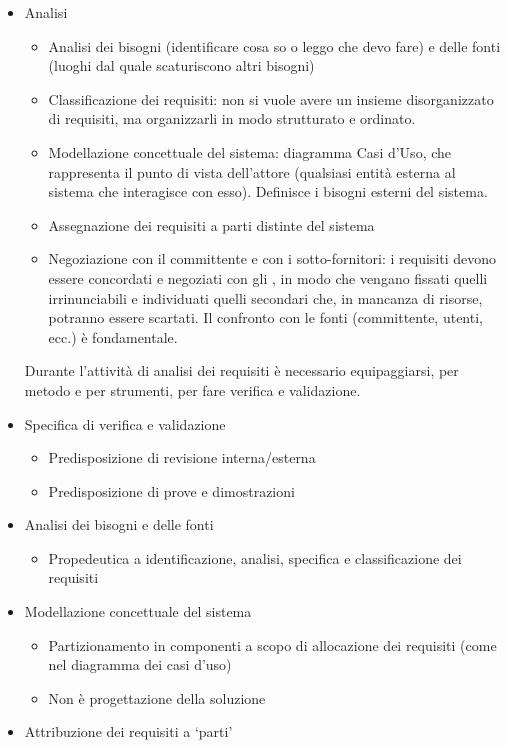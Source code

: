 \begin{itemize}
  \item Analisi
    \begin{itemize}
      \item Analisi dei bisogni (identificare cosa so o leggo che devo fare) e
            delle fonti (luoghi dal quale scaturiscono altri bisogni)
      \item Classificazione dei requisiti: non si vuole avere un insieme
            disorganizzato di requisiti, ma organizzarli in modo strutturato e
            ordinato.
      \item Modellazione concettuale del sistema: diagramma Casi d'Uso, che
            rappresenta il punto di vista dell'attore (qualsiasi entità esterna
            al sistema che interagisce con esso). Definisce i bisogni esterni
            del sistema.
      \item Assegnazione dei requisiti a parti distinte del sistema
      \item Negoziazione con il committente e con i sotto-fornitori: i requisiti
            devono essere concordati e negoziati con gli ,
            in modo che vengano fissati quelli irrinunciabili e individuati
            quelli secondari che, in mancanza di risorse, potranno essere
            scartati. Il confronto con le fonti (committente, utenti, ecc.) è
            fondamentale.
    \end{itemize}

    Durante l'attività di analisi dei requisiti è necessario equipaggiarsi, per
    metodo e per strumenti, per fare verifica e validazione.

  \item Specifica di verifica e validazione
    \begin{itemize}
      \item Predisposizione di revisione interna/esterna
      \item Predisposizione di prove e dimostrazioni
    \end{itemize}
  \item Analisi dei bisogni e delle fonti
    \begin{itemize}
      \item Propedeutica a identificazione, analisi, specifica e classificazione
            dei requisiti
    \end{itemize}
  \item Modellazione concettuale del sistema
    \begin{itemize}
      \item Partizionamento in componenti a scopo di allocazione dei requisiti
            (come nel diagramma dei casi d'uso)
      \item Non è progettazione della soluzione
    \end{itemize}
  \item Attribuzione dei requisiti a `parti'
\end{itemize}

